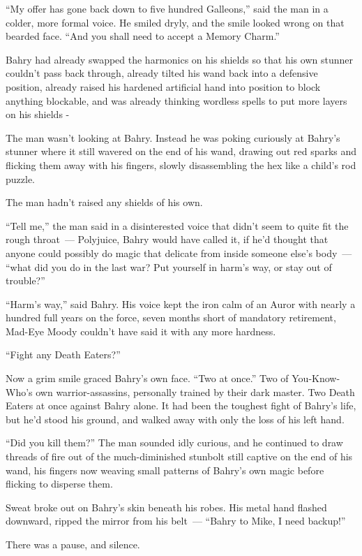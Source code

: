 ``My offer has gone back down to five hundred Galleons,'' said the man in a colder, more formal voice. He smiled dryly, and the smile looked wrong on that bearded face. ``And you shall need to accept a Memory Charm.''

Bahry had already swapped the harmonics on his shields so that his own stunner couldn't pass back through, already tilted his wand back into a defensive position, already raised his hardened artificial hand into position to block anything blockable, and was already thinking wordless spells to put more layers on his shields -

The man wasn't looking at Bahry. Instead he was poking curiously at Bahry's stunner where it still wavered on the end of his wand, drawing out red sparks and flicking them away with his fingers, slowly disassembling the hex like a child's rod puzzle.

The man hadn't raised any shields of his own.

``Tell me,'' the man said in a disinterested voice that didn't seem to quite fit the rough throat~--- Polyjuice, Bahry would have called it, if he'd thought that anyone could possibly do magic that delicate from inside someone else's body~--- ``what did you do in the last war? Put yourself in harm's way, or stay out of trouble?''

``Harm's way,'' said Bahry. His voice kept the iron calm of an Auror with nearly a hundred full years on the force, seven months short of mandatory retirement, Mad-Eye Moody couldn't have said it with any more hardness.

``Fight any Death Eaters?''

Now a grim smile graced Bahry's own face. ``Two at once.'' Two of You-Know-Who's own warrior-assassins, personally trained by their dark master. Two Death Eaters at once against Bahry alone. It had been the toughest fight of Bahry's life, but he'd stood his ground, and walked away with only the loss of his left hand.

``Did you kill them?'' The man sounded idly curious, and he continued to draw threads of fire out of the much-diminished stunbolt still captive on the end of his wand, his fingers now weaving small patterns of Bahry's own magic before flicking to disperse them.

Sweat broke out on Bahry's skin beneath his robes. His metal hand flashed downward, ripped the mirror from his belt~--- ``Bahry to Mike, I need backup!''

There was a pause, and silence.

